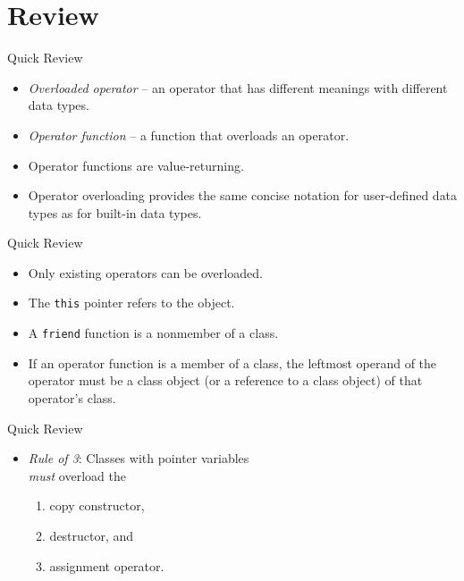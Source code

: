 \documentclass[14pt,aspectratio=1610, hyperref={pdfpagelayout=SinglePage}]{beamer}
\begin{document}

\section{Review}
\begin{frame}[fragile]{Quick Review}
\begin{itemize}[<+->]
\item
  \emph{Overloaded operator} -- an operator that has different meanings with different data types.
\item
  \emph{Operator function} -- a function that overloads an operator.
\item
  Operator functions are value-returning.
\item
  Operator overloading provides the same concise notation for
  user-defined data types as for built-in data types.
\end{itemize}
\end{frame}

\begin{frame}[fragile]{Quick Review}
\begin{itemize}[<+->]
\item
  Only existing operators can be overloaded.
\item
  The \lstinline{this} pointer refers to the object.
\item
  A \lstinline{friend} function is a nonmember of a class.
\item
  If an operator function is a member of a class,
  the leftmost operand of the operator must be a class object (or a
  reference to a class object) of that operator's class.
\end{itemize}
\end{frame}

\begin{frame}[fragile]{Quick Review}
\begin{itemize}
\item
  \emph{Rule of 3}: Classes with pointer variables\\ \emph{must} overload the
  \pause{}
  \begin{enumerate}[<+->]
  \item
    copy constructor,
  \item 
    destructor, and
  \item 
    assignment operator.
  \end{enumerate}
\end{itemize}
\end{frame}
\end{document}
